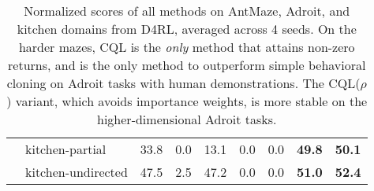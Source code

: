 \begin{table}[]
\begin{tabular}{l|l|r|r|r|r|r||r|r}
& kitchen-partial & 33.8 & 0.0 & 13.1 & 0.0 & 0.0 & \textbf{49.8} & \textbf{50.1} \\
& kitchen-undirected & 47.5 & 2.5 & 47.2 & 0.0 & 0.0 & \textbf{51.0} & \textbf{52.4} \\ \hline
\end{tabular}
\normalsize
\caption{\label{table:adroit_antmaze}{\small Normalized scores of all methods on AntMaze, Adroit, and kitchen domains from D4RL, averaged across 4 seeds. On the harder mazes, CQL is the \textit{only} method that attains non-zero returns, and is the only method to outperform simple behavioral cloning on Adroit tasks with human demonstrations.
The CQL($\rho$) variant, which avoids importance weights, is more stable on the higher-dimensional Adroit tasks.}}
\vspace{-25pt}
\end{table}


